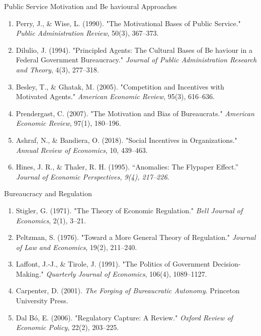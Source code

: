 \documentclass[10pt]{beamer}
\begin{document}
\begin{frame}{Public Service Motivation and Be havioural Approaches}
\footnotesize
\begin{enumerate}
\item Perry, J., \& Wise, L. (1990). "The Motivational Bases of Public Service." \emph{Public Administration Review}, 50(3), 367–373.
\item Dilulio, J. (1994). "Principled Agents: The Cultural Bases of Be haviour in a Federal Government Bureaucracy." \emph{Journal of Public Administration Research and Theory}, 4(3), 277–318.
\item Besley, T., \& Ghatak, M. (2005). "Competition and Incentives with Motivated Agents." \emph{American Economic Review}, 95(3), 616–636.
\item Prendergast, C. (2007). "The Motivation and Bias of Bureaucrats." \emph{American Economic Review}, 97(1), 180–196.
\item Ashraf, N., \& Bandiera, O. (2018). "Social Incentives in Organizations." \emph{Annual Review of Economics}, 10, 439–463.
\item Hines, J. R., \& Thaler, R. H. (1995). “Anomalies: The Flypaper Effect.” \emph{Journal of Economic Perspectives, 9(4), 217–226}.
\end{enumerate}
\end{frame}

\begin{frame}{Bureaucracy and Regulation}
\footnotesize
\begin{enumerate}
\item Stigler, G. (1971). "The Theory of Economic Regulation." \emph{Bell Journal of Economics}, 2(1), 3–21.
\item Peltzman, S. (1976). "Toward a More General Theory of Regulation." \emph{Journal of Law and Economics}, 19(2), 211–240.
\item Laffont, J.-J., \& Tirole, J. (1991). "The Politics of Government Decision-Making." \emph{Quarterly Journal of Economics}, 106(4), 1089–1127.
\item Carpenter, D. (2001). \emph{The Forging of Bureaucratic Autonomy}. Princeton University Press.
\item Dal Bó, E. (2006). "Regulatory Capture: A Review." \emph{Oxford Review of Economic Policy}, 22(2), 203–225.
\end{enumerate}
\end{frame}
\end{document}

